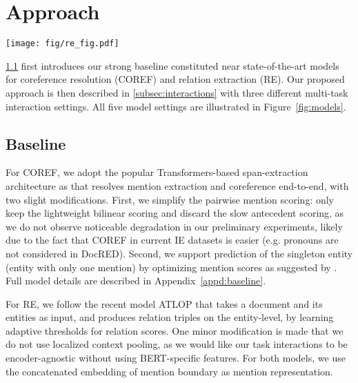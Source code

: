 \documentclass[11pt]{article}
\begin{document}
 \section{Approach}
\label{sec:approach}

\begin{figure*}[t]
\centering
\texttt{[image: fig/re\_fig.pdf]}
\caption{Illustration of five multi-task settings described in \textsection\ref{sec:approach}. The objective of each model is to identify entity clusters as well as their relations, given a document as input. All models except for Pipeline employ ``shared representation'' as an implicit task interaction. +GP further applies graph propagation as an additional implicit interaction, and +GC is designed to leverage task characteristics between COREF and RE as an explicit interaction. }
\label{fig:models}
\vspace{-2ex}
\end{figure*}

\textsection\ref{subsec:baseline} first introduces our strong baseline constituted near state-of-the-art models for coreference resolution (COREF) and relation extraction (RE).
Our proposed approach is then described in \textsection\ref{subsec:interactions} with three different multi-task interaction settings. All five model settings are illustrated in Figure~\ref{fig:models}.

\subsection{Baseline}
\label{subsec:baseline}

For COREF, we adopt the popular Transformers-based span-extraction architecture as \citet{lee-etal-2018-higher,joshi-etal-2019-bert} that resolves mention extraction and coreference end-to-end, with two slight modifications.
First, we simplify the pairwise mention scoring: only keep the lightweight bilinear scoring and discard the slow antecedent scoring, as we do not observe noticeable degradation in our preliminary experiments, likely due to the fact that COREF in current IE datasets is easier (e.g. pronouns are not considered in DocRED).
Second, we support prediction of the singleton entity (entity with only one mention) by optimizing mention scores as suggested by \citet{crac}. Full model details are described in Appendix~\ref{appd:baseline}.

For RE, we follow the recent model ATLOP \citep{atlop} that takes a document and its entities as input, and produces relation triples on the entity-level, by learning adaptive thresholds for relation scores. One minor modification is made that we do not use localized context pooling, as we would like our task interactions to be encoder-agnostic without using BERT-specific features. For both models, we use the concatenated embedding of mention boundary as mention representation.
\end{document}
